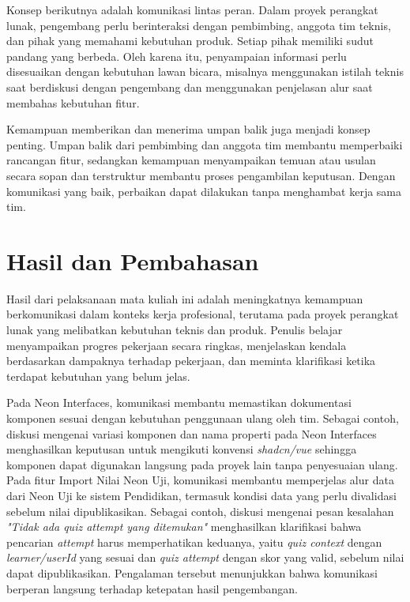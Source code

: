 Konsep berikutnya adalah komunikasi lintas peran. Dalam proyek perangkat lunak, pengembang perlu berinteraksi dengan pembimbing, anggota tim teknis, dan pihak yang memahami kebutuhan produk. Setiap pihak memiliki sudut pandang yang berbeda. Oleh karena itu, penyampaian informasi perlu disesuaikan dengan kebutuhan lawan bicara, misalnya menggunakan istilah teknis saat berdiskusi dengan pengembang dan menggunakan penjelasan alur saat membahas kebutuhan fitur.

Kemampuan memberikan dan menerima umpan balik juga menjadi konsep penting. Umpan balik dari pembimbing dan anggota tim membantu memperbaiki rancangan fitur, sedangkan kemampuan menyampaikan temuan atau usulan secara sopan dan terstruktur membantu proses pengambilan keputusan. Dengan komunikasi yang baik, perbaikan dapat dilakukan tanpa menghambat kerja sama tim.

\section{Hasil dan Pembahasan}
Hasil dari pelaksanaan mata kuliah ini adalah meningkatnya kemampuan berkomunikasi dalam konteks kerja profesional, terutama pada proyek perangkat lunak yang melibatkan kebutuhan teknis dan produk. Penulis belajar menyampaikan progres pekerjaan secara ringkas, menjelaskan kendala berdasarkan dampaknya terhadap pekerjaan, dan meminta klarifikasi ketika terdapat kebutuhan yang belum jelas.

Pada Neon Interfaces, komunikasi membantu memastikan dokumentasi komponen sesuai dengan kebutuhan penggunaan ulang oleh tim. Sebagai contoh, diskusi mengenai variasi komponen dan nama properti pada Neon Interfaces menghasilkan keputusan untuk mengikuti konvensi \textit{shadcn/vue} sehingga komponen dapat digunakan langsung pada proyek lain tanpa penyesuaian ulang. Pada fitur Import Nilai Neon Uji, komunikasi membantu memperjelas alur data dari Neon Uji ke sistem Pendidikan, termasuk kondisi data yang perlu divalidasi sebelum nilai dipublikasikan. Sebagai contoh, diskusi mengenai pesan kesalahan \textit{"Tidak ada quiz attempt yang ditemukan"} menghasilkan klarifikasi bahwa pencarian \textit{attempt} harus memperhatikan keduanya, yaitu \textit{quiz context} dengan \textit{learner\slash userId} yang sesuai dan \textit{quiz attempt} dengan skor yang valid, sebelum nilai dapat dipublikasikan. Pengalaman tersebut menunjukkan bahwa komunikasi berperan langsung terhadap ketepatan hasil pengembangan.

